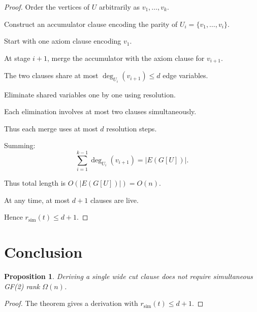 \documentclass[11pt]{article}
\newtheorem{proposition}{Proposition}
\begin{document}
\begin{proof}
Order the vertices of $U$ arbitrarily as $v_1,\dots,v_k$.

Construct an accumulator clause encoding the parity of $U_i=\{v_1,\dots,v_i\}$.

Start with one axiom clause encoding $v_1$.

At stage $i+1$, merge the accumulator with the axiom clause for $v_{i+1}$.

The two clauses share at most $\deg_{U_i}(v_{i+1})\le d$ edge variables.

Eliminate shared variables one by one using resolution.

Each elimination involves at most two clauses simultaneously.

Thus each merge uses at most $d$ resolution steps.

Summing:
\[
\sum_{i=1}^{k-1} \deg_{U_i}(v_{i+1}) = |E(G[U])|.
\]

Thus total length is $O(|E(G[U])|)=O(n)$.

At any time, at most $d+1$ clauses are live.

Hence $r_{\mathrm{sim}}(t)\le d+1$.
\end{proof}

\section{Conclusion}

\begin{proposition}
Deriving a single wide cut clause does not require simultaneous GF(2) rank $\Omega(n)$.
\end{proposition}

\begin{proof}
The theorem gives a derivation with $r_{\mathrm{sim}}(t)\le d+1$.
\end{proof}
\end{document}
